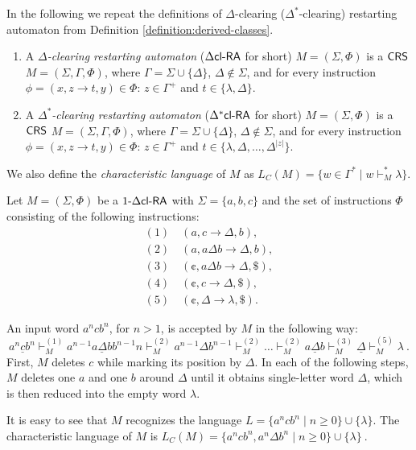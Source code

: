 \begin{definition}[\cite{CM10}]
In the following we repeat the definitions of $\Delta$-clearing ($\Delta^*$-clearing) restarting automaton from Definition \ref{definition:derived-classes}.
\begin{enumerate}
\item\label{definition:dxclra_dclra} A \emph{$\Delta$-clearing restarting automaton}  (\emph{$\DclRA$} for short) $M = (\Sigma, \Phi)$ is a $\CRS$ $M = (\Sigma, \Gamma, \Phi)$, where $\Gamma = \Sigma \cup \{\Delta\}$, $\Delta \notin \Sigma$, and for every instruction $\phi = (x, z \to t, y) \in \Phi$: $z \in \Gamma^+$ and $t \in \{\lambda, \Delta\}$.
\item\label{definition:dxclra_dxclra} A \emph{$\Delta^*$-clearing restarting automaton} (\emph{$\DXclRA$} for short) $M = (\Sigma, \Phi)$ is a $\CRS$ $M = (\Sigma, \Gamma, \Phi)$, where $\Gamma = \Sigma \cup \{\Delta\}$, $\Delta \notin \Sigma$, and for every instruction $\phi = (x, z \to t, y) \in \Phi$: $z \in \Gamma^+$ and $t \in \{\lambda, \Delta, \ldots, \Delta^{|z|}\}$.
\end{enumerate}
We also define the \emph{characteristic language} of $M$ as $L_C(M) = \{ w \in \Gamma^* \mid w \vdash_M^* \lambda \}$.
\end{definition}

\begin{example}\label{example:dxclra_a^n_c_b^n}
Let $M = (\Sigma, \Phi)$ be a $\kDclRA[1]$ with $\Sigma = \{a, b, c\}$ and the set of instructions $\Phi$ consisting of the following instructions:
$$
\begin{array}{l}
(1) \quad (a, c \to \Delta, b),\\
(2) \quad (a, a\Delta b \to \Delta, b),\\
(3) \quad (\cent, a \Delta b \to \Delta, \$),\\
(4) \quad (\cent, c \to \Delta, \$),\\
(5) \quad (\cent, \Delta \to \lambda, \$).
\end{array}
$$

An input word $a^n c b^n$, for $n > 1$, is accepted by $M$ in the following way:
$$
a^n\underline{c}b^n \vdash_M^{(1)} a^{n-1}\underline{a \Delta b} b^{n-1}n
\vdash_M^{(2)} a^{n-1} \Delta b^{n-1} \vdash_M^{(2)} \ldots
\vdash_M^{(2)} \underline{a \Delta b}
\vdash_M^{(3)} \underline{\Delta}
\vdash_M^{(5)} \lambda\ .
$$
First, $M$ deletes $c$ while marking its position by $\Delta$. In each of the following steps, $M$ deletes one $a$ and one $b$ around $\Delta$ until it obtains single-letter word $\Delta$, which is then reduced into the empty word $\lambda$.

It is easy to see that $M$ recognizes the language $L = \{a^ncb^n \mid n\ge 0\} \cup \{\lambda\}$. The characteristic language of $M$ is $L_C(M) = \{a^ncb^n,a^n \Delta b^n \mid n \ge 0 \} \cup\{\lambda\}\ $.
\end{example}

